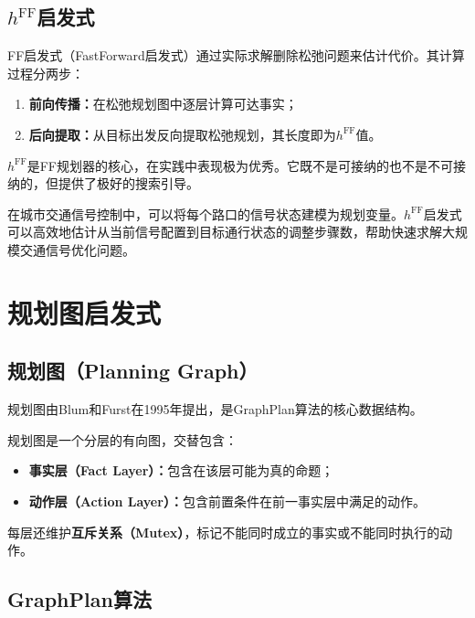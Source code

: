 \subsection{$h^{\mathrm{FF}}$启发式}

FF启发式（FastForward启发式）通过实际求解删除松弛问题来估计代价。其计算过程分两步：
\begin{enumerate}
  \item \textbf{前向传播：}在松弛规划图中逐层计算可达事实；
  \item \textbf{后向提取：}从目标出发反向提取松弛规划，其长度即为$h^{\mathrm{FF}}$值。
\end{enumerate}

$h^{\mathrm{FF}}$是FF规划器的核心，在实践中表现极为优秀。它既不是可接纳的也不是不可接纳的，但提供了极好的搜索引导。

\begin{appbox}[title={\textbf{应用：交通信号规划}}]
在城市交通信号控制中，可以将每个路口的信号状态建模为规划变量。$h^{\mathrm{FF}}$启发式可以高效地估计从当前信号配置到目标通行状态的调整步骤数，帮助快速求解大规模交通信号优化问题。
\end{appbox}

\section{规划图启发式 \ug}

\subsection{规划图（Planning Graph）}

规划图由Blum和Furst在1995年提出，是GraphPlan算法的核心数据结构。

\begin{definition}[规划图]
规划图是一个分层的有向图，交替包含：
\begin{itemize}
  \item \textbf{事实层（Fact Layer）：}包含在该层可能为真的命题；
  \item \textbf{动作层（Action Layer）：}包含前置条件在前一事实层中满足的动作。
\end{itemize}
每层还维护\textbf{互斥关系（Mutex）}，标记不能同时成立的事实或不能同时执行的动作。
\end{definition}

\subsection{GraphPlan算法}

